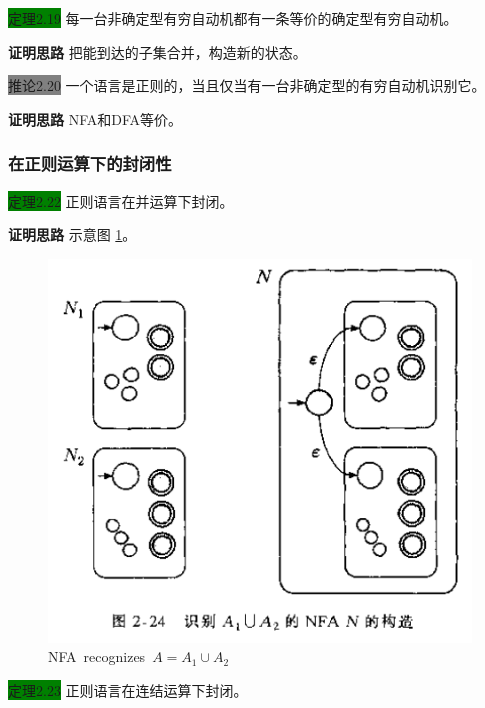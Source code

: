 \documentclass[a4paper]{article}
\begin{document}
	\colorbox{green}{定理2.19} 每一台非确定型有穷自动机都有一条等价的确定型有穷自动机。
	
	\textbf{证明思路} \quad 把能到达的子集合并，构造新的状态。

	\colorbox{gray}{推论2.20} 一个语言是正则的，当且仅当有一台非确定型的有穷自动机识别它。
	
	\textbf{证明思路} \quad NFA和DFA等价。

\subsubsection{在正则运算下的封闭性}

	\colorbox{green}{定理2.22}  正则语言在并运算下封闭。
	
	\textbf{证明思路} \quad 示意图 \ref{F020203-1}。
	\begin{figure}[htb]
		\centering
		\includegraphics[scale=0.8]{./figure/2.2.3-1.png}
		\caption{NFA~recognizes~$A=A_1 \cup A_2$}
		\label{F020203-1}
	\end{figure}

	\colorbox{green}{定理2.23}  正则语言在连结运算下封闭。
	
\end{document}
